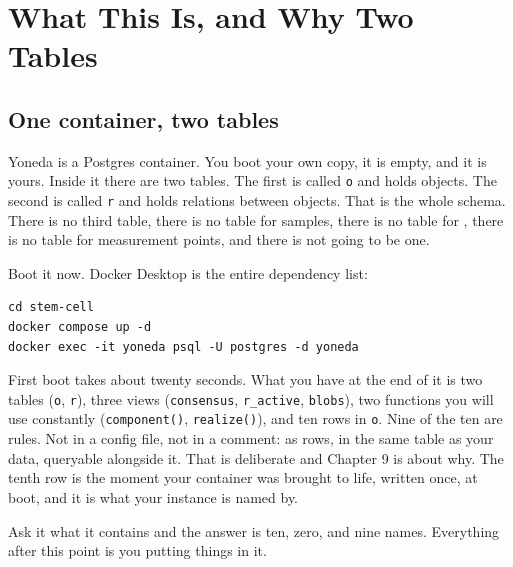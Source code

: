 \chapter{What This Is, and Why Two Tables}

\section{One container, two tables}

Yoneda is a Postgres container. You boot your own copy, it is empty, and it is yours. Inside it there are two tables. The first is called \texttt{o} and holds objects. The second is called \texttt{r} and holds relations between objects. That is the whole schema. There is no third table, there is no table for samples, there is no table for \labRuns{}, there is no table for measurement points, and there is not going to be one.

Boot it now. Docker Desktop is the entire dependency list:

\begin{verbatim}
cd stem-cell
docker compose up -d
docker exec -it yoneda psql -U postgres -d yoneda
\end{verbatim}

First boot takes about twenty seconds. What you have at the end of it is two tables (\texttt{o}, \texttt{r}), three views (\texttt{consensus}, \texttt{r\_active}, \texttt{blobs}), two functions you will use constantly (\texttt{component()}, \texttt{realize()}), and ten rows in \texttt{o}. Nine of the ten are rules. Not in a config file, not in a comment: as rows, in the same table as your data, queryable alongside it. That is deliberate and Chapter 9 is about why. The tenth row is the moment your container was brought to life, written once, at boot, and it is what your instance is named by.

Ask it what it contains and the answer is ten, zero, and nine names. Everything after this point is you putting things in it.

